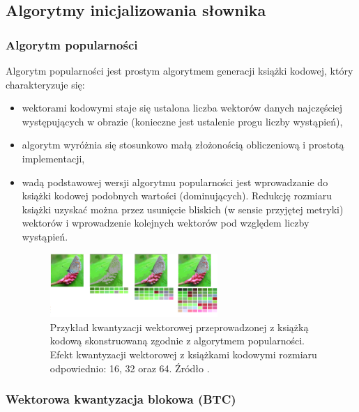 \documentclass{article}
\begin{document}
\subsection{Algorytmy inicjalizowania słownika}

\subsubsection{Algorytm popularności}

Algorytm popularności jest prostym algorytmem generacji książki kodowej, który charakteryzuje się:

\begin{itemize}
  \item wektorami kodowymi staje się ustalona liczba wektorów danych najczęściej występujących
        w obrazie (konieczne jest ustalenie progu liczby wystąpień),
  \item algorytm wyróżnia się stosunkowo małą złożonością obliczeniową i prostotą implementacji,
  \item wadą podstawowej wersji algorytmu popularności jest wprowadzanie do książki kodowej podobnych wartości (dominujących).
        Redukcję rozmiaru książki uzyskać można przez usunięcie bliskich (w sensie przyjętej metryki) wektorów i 
        wprowadzenie kolejnych wektorów pod względem liczby wystąpień.
        
        \begin{figure}[H]
          \centering
          \includegraphics[width=0.6\textwidth]{images/motyle_2.png}
          \caption{Przykład kwantyzacji wektorowej przeprowadzonej z książką kodową skonstruowaną zgodnie z algorytmem popularności.
            Efekt kwantyzacji wektorowej z książkami kodowymi rozmiaru odpowiednio: 16, 32 oraz 64. Źródło \cite{aprzelaskowski}.}
          \label{fig:motyle_2}
        \end{figure}
        
\end{itemize}

\subsubsection{Wektorowa kwantyzacja blokowa (BTC)}
\end{document}
